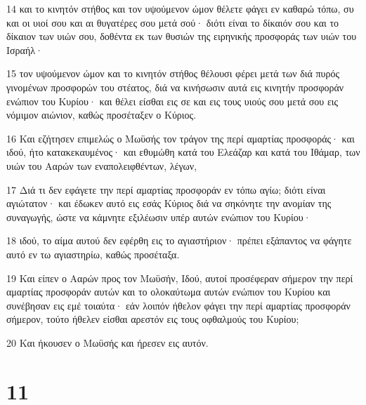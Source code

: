 \par 14 και το κινητόν στήθος και τον υψούμενον ώμον θέλετε φάγει εν καθαρώ τόπω, συ και οι υιοί σου και αι θυγατέρες σου μετά σού· διότι είναι το δίκαιόν σου και το δίκαιον των υιών σου, δοθέντα εκ των θυσιών της ειρηνικής προσφοράς των υιών του Ισραήλ·
\par 15 τον υψούμενον ώμον και το κινητόν στήθος θέλουσι φέρει μετά των διά πυρός γινομένων προσφορών του στέατος, διά να κινήσωσιν αυτά εις κινητήν προσφοράν ενώπιον του Κυρίου· και θέλει είσθαι εις σε και εις τους υιούς σου μετά σου εις νόμιμον αιώνιον, καθώς προσέταξεν ο Κύριος.
\par 16 Και εζήτησεν επιμελώς ο Μωϋσής τον τράγον της περί αμαρτίας προσφοράς· και ιδού, ήτο κατακεκαυμένος· και εθυμώθη κατά του Ελεάζαρ και κατά του Ιθάμαρ, των υιών του Ααρών των εναπολειφθέντων, λέγων,
\par 17 Διά τι δεν εφάγετε την περί αμαρτίας προσφοράν εν τόπω αγίω; διότι είναι αγιώτατον· και έδωκεν αυτό εις εσάς Κύριος διά να σηκόνητε την ανομίαν της συναγωγής, ώστε να κάμνητε εξιλέωσιν υπέρ αυτών ενώπιον του Κυρίου·
\par 18 ιδού, το αίμα αυτού δεν εφέρθη εις το αγιαστήριον· πρέπει εξάπαντος να φάγητε αυτό εν τω αγιαστηρίω, καθώς προσέταξα.
\par 19 Και είπεν ο Ααρών προς τον Μωϋσήν, Ιδού, αυτοί προσέφεραν σήμερον την περί αμαρτίας προσφοράν αυτών και το ολοκαύτωμα αυτών ενώπιον του Κυρίου και συνέβησαν εις εμέ τοιαύτα· εάν λοιπόν ήθελον φάγει την περί αμαρτίας προσφοράν σήμερον, τούτο ήθελεν είσθαι αρεστόν εις τους οφθαλμούς του Κυρίου;
\par 20 Και ήκουσεν ο Μωϋσής και ήρεσεν εις αυτόν.

\chapter{11}

